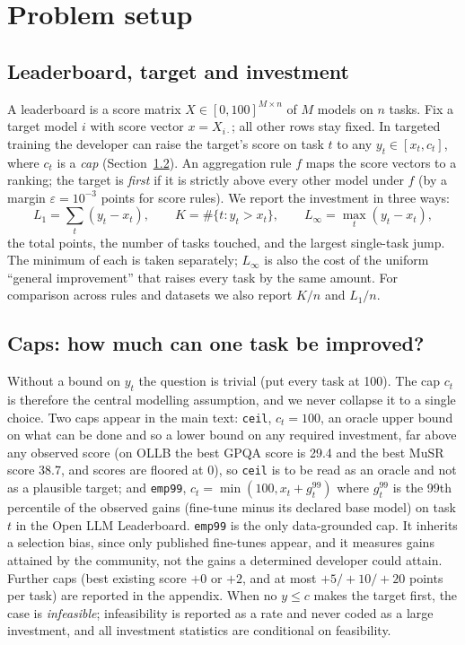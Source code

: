 \documentclass{article}
\begin{document}
\section{Problem setup}
\label{sec:setup}
\subsection{Leaderboard, target and investment}
A leaderboard is a score matrix $X\in[0,100]^{M\times n}$ of $M$ models on $n$ tasks. Fix a target model $i$ with score vector $x=X_{i\cdot}$; all other rows stay fixed. In targeted training the developer can raise the target's score on task $t$ to any $y_t\in[x_t,c_t]$, where $c_t$ is a \emph{cap} (Section~\ref{sec:caps}). An aggregation rule $f$ maps the score vectors to a ranking; the target is \emph{first} if it is strictly above every other model under $f$ (by a margin $\varepsilon=10^{-3}$ points for score rules). We report the investment in three ways:
\[
L_1=\sum_t (y_t-x_t),\qquad K=\#\{t: y_t>x_t\},\qquad L_\infty=\max_t (y_t-x_t),
\]
the total points, the number of tasks touched, and the largest single-task jump. The minimum of each is taken separately; $L_\infty$ is also the cost of the uniform ``general improvement'' that raises every task by the same amount. For comparison across rules and datasets we also report $K/n$ and $L_1/n$.

\subsection{Caps: how much can one task be improved?}
\label{sec:caps}
Without a bound on $y_t$ the question is trivial (put every task at 100). The cap $c_t$ is therefore the central modelling assumption, and we never collapse it to a single choice. Two caps appear in the main text: \texttt{ceil}, $c_t=100$, an oracle upper bound on what can be done and so a lower bound on any required investment, far above any observed score (on OLLB the best GPQA score is 29.4 and the best MuSR score 38.7, and scores are floored at 0), so \texttt{ceil} is to be read as an oracle and not as a plausible target; and \texttt{emp99}, $c_t=\min(100,x_t+g_t^{99})$ where $g_t^{99}$ is the 99th percentile of the observed gains (fine-tune minus its declared base model) on task $t$ in the Open LLM Leaderboard. \texttt{emp99} is the only data-grounded cap. It inherits a selection bias, since only published fine-tunes appear, and it measures gains attained by the community, not the gains a determined developer could attain. Further caps (best existing score $+0$ or $+2$, and at most $+5/+10/+20$ points per task) are reported in the appendix. When no $y\le c$ makes the target first, the case is \emph{infeasible}; infeasibility is reported as a rate and never coded as a large investment, and all investment statistics are conditional on feasibility.
\end{document}
